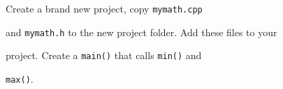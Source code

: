 Create a brand new project, copy \texttt{mymath.cpp}

and \texttt{mymath.h} to the new project folder. Add these files to your

project. Create a \texttt{main()} that calls \texttt{min()} and

\texttt{max()}.

